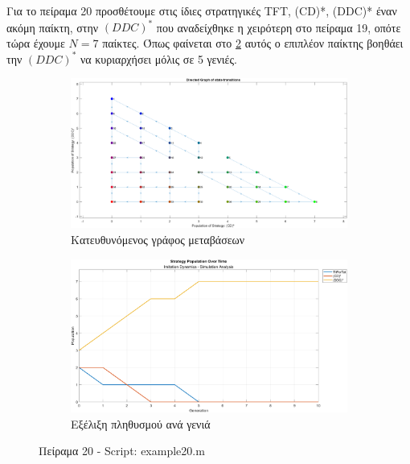 \documentclass[12pt]{report}
\begin{document}
Για το πείραμα 20 προσθέτουμε στις ίδιες στρατηγικές \foreignlanguage{english}{TFT, (CD)*, (DDC)*} έναν ακόμη παίκτη, στην $(DDC)^*$ που αναδείχθηκε η χειρότερη στο πείραμα 19, οπότε τώρα έχουμε $N=7$ παίκτες. Όπως φαίνεται στο \ref{fig:fig20-sim} αυτός ο επιπλέον παίκτης βοηθάει την $(DDC)^*$ να κυριαρχήσει μόλις σε 5 γενιές.
\begin{figure}[H]
    \centering

    \begin{subfigure}[b]{0.45\textwidth}
        \includegraphics[width=\linewidth]{Figures Imitation Dynamics/example20.png}
        \caption{Κατευθυνόμενος γράφος μεταβάσεων}
        \label{fig:fig20}
    \end{subfigure}
    \hfill
    \begin{subfigure}[b]{0.45\textwidth}
        \includegraphics[width=\linewidth]{Figures Imitation Dynamics/example20-sim.png}
        \caption{Εξέλιξη πληθυσμού ανά γενιά}
        \label{fig:fig20-sim}
    \end{subfigure}

    \caption{Πείραμα 20 - \foreignlanguage{english}{Script: example20.m}}
    \label{fig:example20}
\end{figure}
\end{document}
